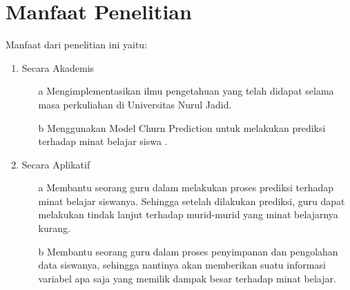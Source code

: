 \section{Manfaat Penelitian}

Manfaat dari penelitian ini yaitu:
\begin{enumerate}
	\item Secara Akademis

\begin{enumerate}
\item[a] Mengimplementasikan ilmu pengetahuan yang telah didapat selama masa perkuliahan di Universitas Nurul Jadid.
\item[b] Menggunakan Model Churn Prediction untuk melakukan prediksi terhadap minat belajar siswa .
\end{enumerate} 
    

	\item Secara Aplikatif
	
\begin{enumerate}
\item[a] Membantu seorang guru dalam melakukan proses prediksi terhadap minat belajar siswanya. Sehingga setelah dilakukan prediksi, guru dapat melakukan tindak lanjut terhadap murid-murid yang minat belajarnya kurang.
\item[b] Membantu seorang guru dalam proses penyimpanan dan pengolahan data siswanya, sehingga nantinya akan memberikan suatu informasi variabel apa saja yang memilik dampak besar terhadap minat belajar.
\end{enumerate} 
	
	
\end{enumerate}
